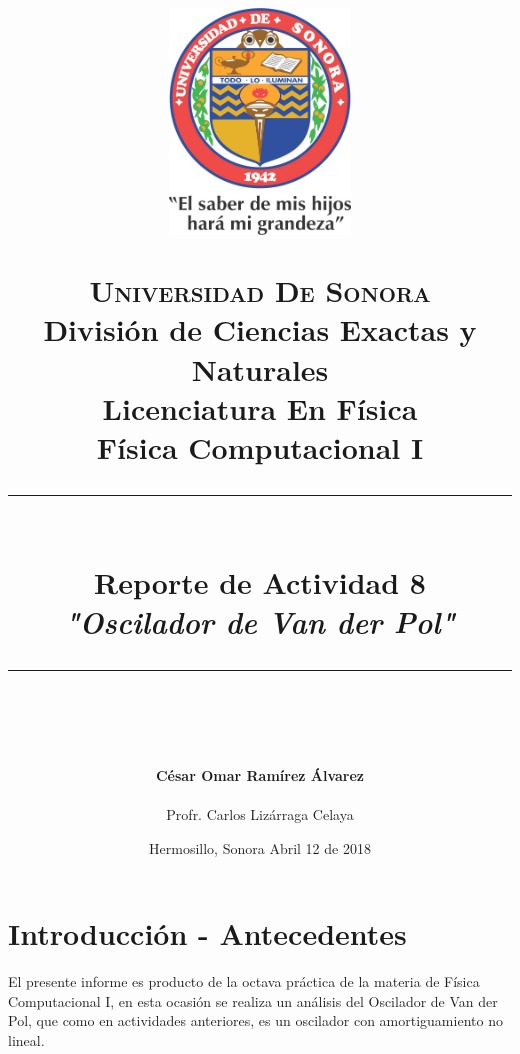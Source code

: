 \documentclass[12pt]{article}
\newcommand{\HRule}[1]{\rule{\linewidth}{#1}}
\begin{document}
\begin{titlepage}

\title{ \normalsize 
        \begin{center}
        \includegraphics[height=6cm]{Logo.jpg}
        \end{center}
        \LARGE \textsc{\textbf{Universidad De Sonora}} \\ \bigskip
		\Large División de Ciencias Exactas y Naturales \\
        Licenciatura En Física \\ \bigskip
        \bigskip
        Física Computacional I
		\\ [0.1cm]  
		\HRule{2pt} \\
		\Large \textbf{{Reporte de Actividad 8}} \\
        \textit{\textbf{"Oscilador de Van der Pol"}}
		\HRule{2pt} \\
		\normalsize \vspace*{0.001\baselineskip}}
        
\date{\bigskip \Large Hermosillo, Sonora  \hspace*{\fill}  Abril 12 de 2018}

        
\author{
		\Large\textbf{ César Omar Ramírez Álvarez} \\ \bigskip
        \\ \bigskip
       \Large Profr. Carlos Lizárraga Celaya}
       \end{titlepage}
       \maketitle
       

\newpage
\pagestyle{plain}
\section*{Introducción - Antecedentes}
El presente informe es producto de la octava práctica de la materia de Física Computacional I, en esta ocasión se realiza un análisis del Oscilador de Van der Pol, que como en actividades anteriores, es un oscilador con amortiguamiento no lineal.\\
\end{document}
